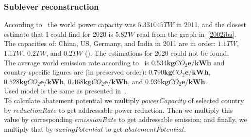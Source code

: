 \documentclass[11pt, twocolumn]{article}
\begin{document}
\subsubsection{Sublever reconstruction\label{sec:dm:reconstruction}}
According to~\citep{eia2011} the world power capacity was $5.331045 TW$ in 2011, and the closest estimate that I could find for 2020 is $5.8 TW$ read from the graph in~\ref{2002iba}. The capacities of: China, US, Germany, and India in 2011 are in order: $1.1 TW$, $1.1 TW$, $0.2 TW$, and $0.2 TW$ (\citep{eia2011}). The estimations for 2020 could not be found.\\
The average world emission rate according to~\citep{iea2012co2} is $\mathbf{0.534 kg}CO_2\mathbf{e}/\mathbf{kWh}$ and country specific figures are (in preserved order): $\mathbf{0.790 kg}CO_2\mathbf{e}/\mathbf{kWh}$, $\mathbf{0.528 kg}CO_2\mathbf{e}/\mathbf{kWh}$, $\mathbf{0.468 kg}CO_2\mathbf{e}/\mathbf{kWh}$, and $\mathbf{0.936 kg}CO_2\mathbf{e}/\mathbf{kWh}$.\\

Used model is the same as presented in~\citep{grid2008green}.\\
To calculate abatement potential we multiply $powerCapacity$ of selected country by $reductionRate$ to get addressable power reduction. Then we multiply this value by corresponding $emissionRate$ to get addressable emission; and finally, we multiply that by $savingPotential$ to get $abatementPotential$.\\
\end{document}
